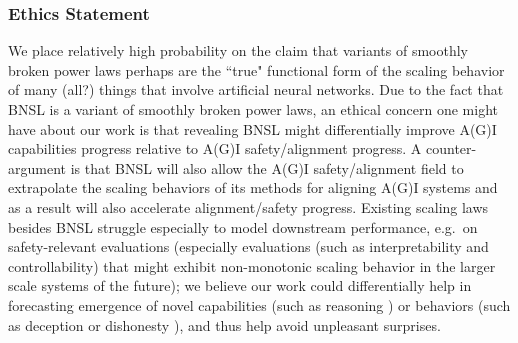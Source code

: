 \documentclass{article} %
\begin{document}

\vspace{-1.4975mm}
\subsubsection*{Ethics Statement}
\vspace{-1.0975mm}
We place relatively high probability on the claim that variants of smoothly broken power laws perhaps are the ``true" functional form of the scaling behavior of many (all?) things that involve artificial neural networks. Due to the fact that BNSL is a variant of smoothly broken power laws, an ethical concern one might have about our work is that revealing BNSL might differentially \citep{hendrycks2022x} improve A(G)I capabilities progress relative to A(G)I safety/alignment progress. 
A counter-argument is that BNSL will also allow the A(G)I safety/alignment field to extrapolate the scaling behaviors of its methods for aligning A(G)I systems and as a result will also accelerate alignment/safety progress.
Existing scaling laws besides BNSL struggle especially to model downstream performance, e.g.\ on safety-relevant evaluations (especially evaluations (such as interpretability and controllability) that might exhibit non-monotonic scaling behavior in the larger scale systems of the future); we believe our work could differentially help in forecasting emergence of novel capabilities (such as reasoning \citep{wei2022chain}) or behaviors (such as deception or dishonesty \citep{evans2021truthful,lin2021truthfulqa}), and thus help avoid unpleasant surprises.
\end{document}
